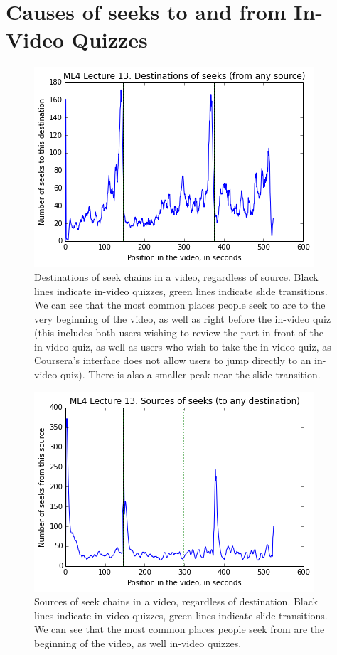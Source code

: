 \documentclass{sigchi}
\begin{document}
\section{Causes of seeks to and from In-Video Quizzes}

\begin{figure}
\includegraphics[width=1.0\columnwidth]{seekdestinations}
\caption{Destinations of seek chains in a video, regardless of source. Black lines indicate in-video quizzes, green lines indicate slide transitions. We can see that the most common places people seek to are to the very beginning of the video, as well as right before the in-video quiz (this includes both users wishing to review the part in front of the in-video quiz, as well as users who wish to take the in-video quiz, as Coursera's interface does not allow users to jump directly to an in-video quiz). There is also a smaller peak near the slide transition.}
\label{fig:seekdestinations}
\end{figure}

\begin{figure}
\includegraphics[width=1.0\columnwidth]{seeksources}
\caption{Sources of seek chains in a video, regardless of destination. Black lines indicate in-video quizzes, green lines indicate slide transitions. We can see that the most common places people seek from are the beginning of the video, as well in-video quizzes.}
\label{fig:seeksources}
\end{figure}
\end{document}
